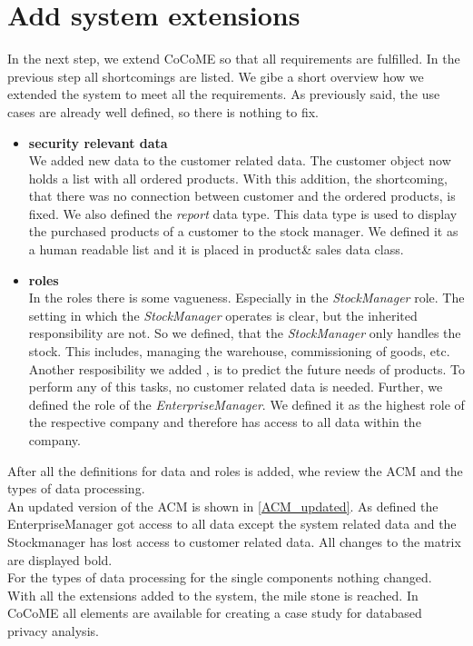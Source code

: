 \section{Add system extensions}
In the next step, we extend CoCoME so that all requirements are fulfilled. In the previous step all shortcomings are listed. We gibe a short overview how we extended the system to meet all the requirements. As previously said, the use cases are already well defined, so there is nothing to fix.
\begin{itemize}
\item \textbf{security relevant data}\\
We added new data to the customer related data. The customer object now holds a list with all ordered products. With this addition, the shortcoming, that there was no connection between customer and the ordered products, is fixed.  We also defined the \textit{report} data type. This data type is used to display the purchased products of a customer to the stock manager. We defined it as a human readable list and it is placed in product\& sales data class.
\item \textbf{roles}\\
In the roles there is some vagueness. Especially in the \textit{StockManager} role. The setting in which the \textit{StockManager} operates is clear, but the inherited responsibility are not. So we defined, that the \textit{StockManager} only handles the stock. This includes, managing the warehouse, commissioning of goods, etc. Another resposibility we added , is to predict the future needs of products. To perform any of this tasks, no customer related data is needed. Further, we defined the role of the \textit{EnterpriseManager}. We defined it as the highest role of the respective company and therefore has access to all data within the company. 
\end{itemize}
After all the definitions for data and roles is added, whe review the ACM and the types of data processing. \\
An updated version of the ACM is shown in \autoref{ACM_updated}. As defined the EnterpriseManager got access to all data except the system related data and the Stockmanager has lost access to customer related data. All changes to the matrix are displayed bold. \\
For the types of data processing for the single components nothing changed.\\
With all the extensions added to the system, the mile stone is reached. In CoCoME all elements are available for creating a case study for databased privacy analysis. 
